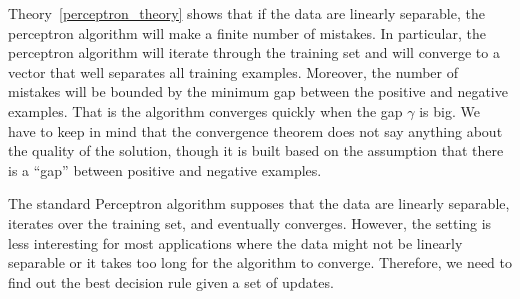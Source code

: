 {\iffalse
\begin{proof}
	Suppose the $k$'th mistake is made on the $i$'th training example, and current weight vector is $\vw^k$.
	In addition, we set $\vw^0=\vzero$.
	As the Perceptron makes a mistake on $(\vx_i,y_i)$, we immediately have
	\begin{align*}
		y_i\ip{\vw_k}{\varphib(\vx_i)} \le 0.
	\end{align*}
	According to update rule, we have
	\begin{align*}
		\vw^{k+1} = \vw^{k} + \rho y_i\varphib(\vx_i).
	\end{align*}
	Then, the following holds
	\begin{align*}
		\ip{\vw^{k+1}}{\hat{\vw}} = \ip{\vw^k}{\hat{\vw}} + \rho y_i\ip{\varphib(\vx_i)}{\hat{\vw}} \ge \ip{\vw^k}{\hat{\vw}} + \rho\gamma.
	\end{align*}
	Straight forward induction gives us
	\begin{align}
		\ip{\vw^{k+1}}{\hat{\vw}}\ge k\rho\gamma. \label{induction1}
	\end{align}
	We also have
	\begin{align*}
		\norm{\vw^{k+1}}^2 
		= \norm{\vw^{k} + \rho y_ix_i}^2
		= \norm{\vw^k}^2 + \rho^2\norm{\varphib(\vx_i)}^2 + 2\rho y_i\ip{\varphib(\vx_i)}{\vw^k}
		\le \norm{\vw^k}^2 + \rho^2R^2
	\end{align*}
	Straight forward induction gives us
	\begin{align}
		\norm{\vw^{k+1}}^2\le k\rho^2R^2. \label{induction2}
	\end{align}
	Together with (\ref{induction1}) and (\ref{induction2}) we have
	\begin{align*}
		k\le{R^2}/{\gamma^2}.
	\end{align*}
\end{proof}
\fi
Theory~\ref{perceptron_theory} shows that if the data are linearly separable, the perceptron algorithm will make a finite number of mistakes. 
In particular, the perceptron algorithm will iterate through the training set and will converge to a vector that well separates all training examples.
Moreover, the number of mistakes will be bounded by the minimum gap between the positive and negative examples.
That is the algorithm converges quickly when the gap $\gamma$ is big.
We have to keep in mind that the convergence theorem does not say anything about the quality of the solution, though it is built based on the assumption that there is a ``gap'' between positive and negative examples.

The standard Perceptron algorithm supposes that the data are linearly separable, iterates over the training set, and eventually converges.
However, the setting is less interesting for most applications where the data might not be linearly separable or it takes too long for the algorithm to converge.
Therefore, we need to find out the best decision rule given a set of updates.

}
